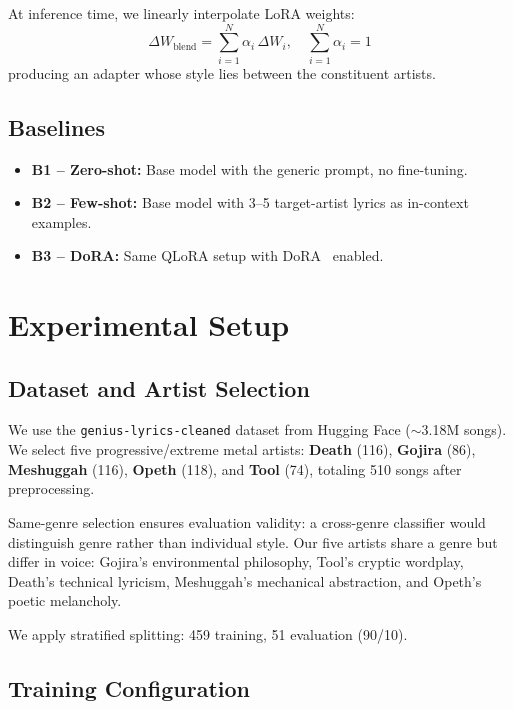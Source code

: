 \documentclass[runningheads]{llncs}
\begin{document}
At inference time, we linearly interpolate LoRA weights:
\begin{equation}
    \Delta W_{\text{blend}} = \sum_{i=1}^{N} \alpha_i \, \Delta W_i, \quad \sum_{i=1}^{N} \alpha_i = 1
\end{equation}
producing an adapter whose style lies between the constituent artists.

\subsection{Baselines}

\begin{itemize}
    \item \textbf{B1 -- Zero-shot:} Base model with the generic prompt, no fine-tuning.
    \item \textbf{B2 -- Few-shot:} Base model with 3--5 target-artist lyrics as in-context examples.
    \item \textbf{B3 -- DoRA:} Same QLoRA setup with DoRA~\cite{liu2024dora} enabled.
\end{itemize}

\section{Experimental Setup}
\label{sec:setup}

\subsection{Dataset and Artist Selection}

We use the \texttt{genius-lyrics-cleaned} dataset from Hugging Face (${\sim}$3.18M songs). We select five progressive/extreme metal artists: \textbf{Death} (116), \textbf{Gojira} (86), \textbf{Meshuggah} (116), \textbf{Opeth} (118), and \textbf{Tool} (74), totaling 510 songs after preprocessing.

Same-genre selection ensures evaluation validity: a cross-genre classifier would distinguish genre rather than individual style. Our five artists share a genre but differ in voice: Gojira's environmental philosophy, Tool's cryptic wordplay, Death's technical lyricism, Meshuggah's mechanical abstraction, and Opeth's poetic melancholy.

We apply stratified splitting: 459 training, 51 evaluation (90/10).

\subsection{Training Configuration}
\end{document}
